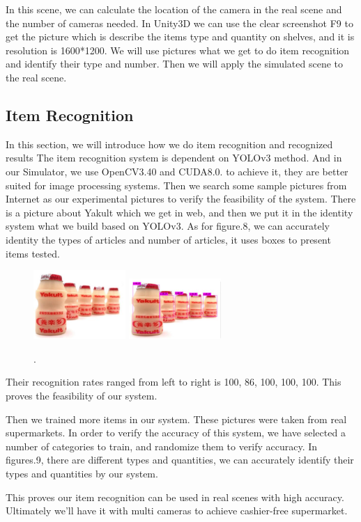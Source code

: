 In this scene, we can calculate the location of the camera in the real scene and the number of cameras needed.
In Unity3D we can use the clear screenshot F9 to get the picture which is describe the items type and quantity on shelves, and it is resolution is 1600*1200.
We will use pictures what we get to do item recognition and identify their type and number.
Then we will apply the simulated scene to the real scene. 

\subsection{Item Recognition}
In this section, we will introduce how we do item recognition and recognized results 
The item recognition system is dependent on YOLOv3 method.
And in our Simulator, we use OpenCV3.40 and CUDA8.0. to achieve it, they are better suited for image processing systems. 
Then we search some sample pictures from Internet as our experimental pictures to verify the feasibility of the system.
There is a picture about Yakult which we get in web, and then we put it in the identity system what we build based on YOLOv3\cite{yolov3}. As for figure.8, we can accurately identity the types of articles and number of articles, it uses boxes to present items tested.
\begin{figure}[htbp]
\centerline{\includegraphics[width=3.5cm,scale=0.6]{Yakult.jpg} \includegraphics[width=3.5cm,scale=0.6]{Yakult_new.jpg}}
\caption{.}
\label{fig}
\end{figure}

Their recognition rates ranged from left to right is 100, 86, 100, 100, 100.
This proves the feasibility of our system.

Then we trained more items in our system.
These pictures were taken from real supermarkets.
In order to verify the accuracy of this system, we have selected a number of categories to train, and randomize them to verify accuracy.
In figures.9, there are different types and quantities, we can accurately identify their types and quantities by our system.

This proves our item recognition can be used in real scenes with high accuracy.
Ultimately we'll have it with multi cameras to achieve cashier-free supermarket.
